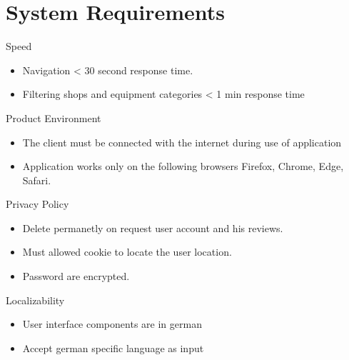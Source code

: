 \section{System Requirements}
Speed
\begin{itemize}
\item Navigation < 30 second response time.
\item  Filtering shops and equipment categories < 1 min response time
\end{itemize}
\vspace*{1cm}
Product Environment
\begin{itemize}
\item The client must be connected with the internet during use of application
\item Application works only on the following browsers {Firefox, Chrome, Edge, Safari}.
\end{itemize}
\vspace*{1cm}
Privacy Policy
\begin{itemize}
\item Delete permanetly on request user account and his reviews.
\item Must allowed cookie to locate the user location.
\item Password are encrypted.
\end{itemize}
\vspace*{1cm}
Localizability 
\begin{itemize}
\item User interface components are in german
\item Accept german specific language as input
\end{itemize}